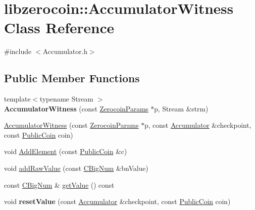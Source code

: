 \hypertarget{classlibzerocoin_1_1_accumulator_witness}{}\section{libzerocoin\+:\+:Accumulator\+Witness Class Reference}
\label{classlibzerocoin_1_1_accumulator_witness}


{\ttfamily \#include $<$Accumulator.\+h$>$}

\subsection*{Public Member Functions}
\begin{DoxyCompactItemize}
\item 
\mbox{\label{classlibzerocoin_1_1_accumulator_witness_a98162d6119fe9aa6399df99aac06d159}} 
{\footnotesize template$<$typename Stream $>$ }\\{\bfseries Accumulator\+Witness} (const \mbox{\hyperlink{classlibzerocoin_1_1_zerocoin_params}{Zerocoin\+Params}} $\ast$p, Stream \&strm)
\item 
\mbox{\hyperlink{classlibzerocoin_1_1_accumulator_witness_af1abca6db569d151f4b416221f28d18e}{Accumulator\+Witness}} (const \mbox{\hyperlink{classlibzerocoin_1_1_zerocoin_params}{Zerocoin\+Params}} $\ast$p, const \mbox{\hyperlink{classlibzerocoin_1_1_accumulator}{Accumulator}} \&checkpoint, const \mbox{\hyperlink{classlibzerocoin_1_1_public_coin}{Public\+Coin}} coin)
\item 
void \mbox{\hyperlink{classlibzerocoin_1_1_accumulator_witness_aa567ece888a3b06498b668ed3f613bdb}{Add\+Element}} (const \mbox{\hyperlink{classlibzerocoin_1_1_public_coin}{Public\+Coin}} \&c)
\item 
void \mbox{\hyperlink{classlibzerocoin_1_1_accumulator_witness_a7c5b47a42f8a2c51f7c7f64ff0809f7d}{add\+Raw\+Value}} (const \mbox{\hyperlink{class_c_big_num}{C\+Big\+Num}} \&bn\+Value)
\item 
const \mbox{\hyperlink{class_c_big_num}{C\+Big\+Num}} \& \mbox{\hyperlink{classlibzerocoin_1_1_accumulator_witness_af0afa4225f01cd21bdc8e88e310a0168}{get\+Value}} () const
\item 
\mbox{\label{classlibzerocoin_1_1_accumulator_witness_a6edd0f05c65891cc10a58e5cd7eaf277}} 
void {\bfseries reset\+Value} (const \mbox{\hyperlink{classlibzerocoin_1_1_accumulator}{Accumulator}} \&checkpoint, const \mbox{\hyperlink{classlibzerocoin_1_1_public_coin}{Public\+Coin}} coin)

\end{DoxyCompactItemize}

